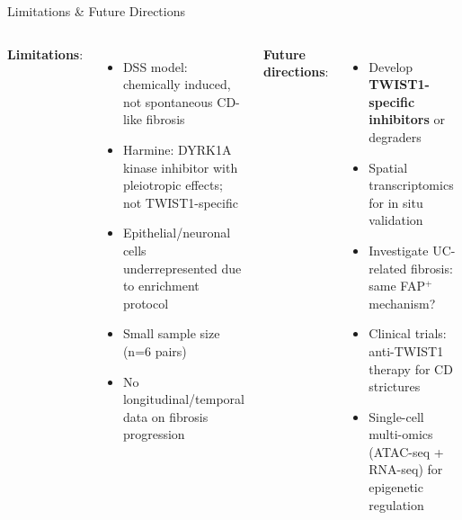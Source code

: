 \documentclass[aspectratio=169,10pt]{beamer}
\begin{document}
\begin{frame}{Limitations \& Future Directions}
\begin{columns}[T]
\textbf{Limitations}:
\begin{itemize}
  \item DSS model: chemically induced, not spontaneous CD-like fibrosis
  \item Harmine: DYRK1A kinase inhibitor with pleiotropic effects; not TWIST1-specific
  \item Epithelial/neuronal cells underrepresented due to enrichment protocol
  \item Small sample size (n=6 pairs)
  \item No longitudinal/temporal data on fibrosis progression
\end{itemize}

\textbf{Future directions}:
\begin{itemize}
  \item Develop \textbf{TWIST1-specific inhibitors} or degraders
  \item Spatial transcriptomics for in situ validation
  \item Investigate UC-related fibrosis: same FAP$^+$ mechanism?
  \item Clinical trials: anti-TWIST1 therapy for CD strictures
  \item Single-cell multi-omics (ATAC-seq + RNA-seq) for epigenetic regulation
\end{itemize}
\end{columns}
\end{frame}
\end{document}
